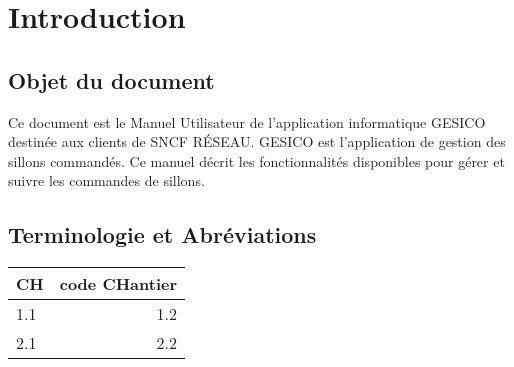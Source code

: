 \documentclass[a4paper]{report}
\begin{document}
\chapter{Introduction}
\section{Objet du document}
Ce document est le Manuel Utilisateur de l’application informatique GESICO destinée aux clients de SNCF RÉSEAU. GESICO est l’application de gestion des sillons commandés. Ce manuel décrit les fonctionnalités disponibles pour gérer et suivre les commandes de sillons.

\section{Terminologie et Abréviations}	
\begin{tabular}{|l|r|}
	\hline
	CH & code \textbf{CH}antier \\
	\hline
	1.1 & 1.2 \\
	\hline
	2.1 & 2.2 \\
	\hline
\end{tabular}
\end{document}
